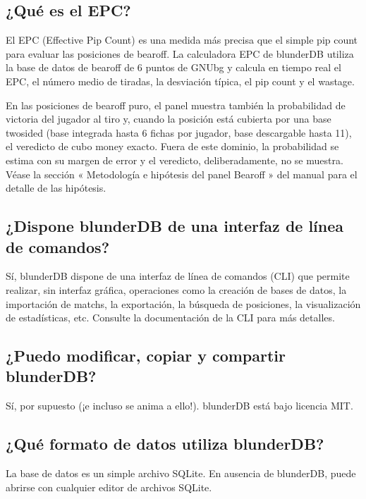 \documentclass[letterpaper,10pt,spanish]{sphinxmanual}
\begin{document}
\subsection{¿Qué es el EPC?}
\label{\detokenize{faq:qu-est-ce-que-l-epc}}
\sphinxAtStartPar
El EPC (Effective Pip Count) es una medida más precisa que el simple pip count para evaluar las posiciones de bearoff. La calculadora EPC de blunderDB utiliza la base de datos de bearoff de 6 puntos de GNUbg y calcula en tiempo real el EPC, el número medio de tiradas, la desviación típica, el pip count y el wastage.

\sphinxAtStartPar
En las posiciones de bearoff puro, el panel muestra también la probabilidad de victoria del jugador al tiro y, cuando la posición está cubierta por una base two\sphinxhyphen{}sided (base integrada hasta 6 fichas por jugador, base descargable hasta 11), el veredicto de cubo money exacto. Fuera de este dominio, la probabilidad se estima con su margen de error y el veredicto, deliberadamente, no se muestra. Véase la sección « Metodología e hipótesis del panel Bearoff » del manual para el detalle de las hipótesis.


\subsection{¿Dispone blunderDB de una interfaz de línea de comandos?}
\label{\detokenize{faq:blunderdb-dispose-t-il-d-une-interface-en-ligne-de-commande}}
\sphinxAtStartPar
Sí, blunderDB dispone de una interfaz de línea de comandos (CLI) que permite realizar, sin interfaz gráfica, operaciones como la creación de bases de datos, la importación de matchs, la exportación, la búsqueda de posiciones, la visualización de estadísticas, etc. Consulte la documentación de la CLI para más detalles.


\subsection{¿Puedo modificar, copiar y compartir blunderDB?}
\label{\detokenize{faq:puis-je-modifier-copier-partager-blunderdb}}
\sphinxAtStartPar
Sí, por supuesto (¡e incluso se anima a ello!). blunderDB está bajo licencia MIT.


\subsection{¿Qué formato de datos utiliza blunderDB?}
\label{\detokenize{faq:quel-format-de-donnees-utilise-blunderdb}}
\sphinxAtStartPar
La base de datos es un simple archivo SQLite. En ausencia de blunderDB, puede abrirse con cualquier editor de archivos SQLite.
\end{document}
